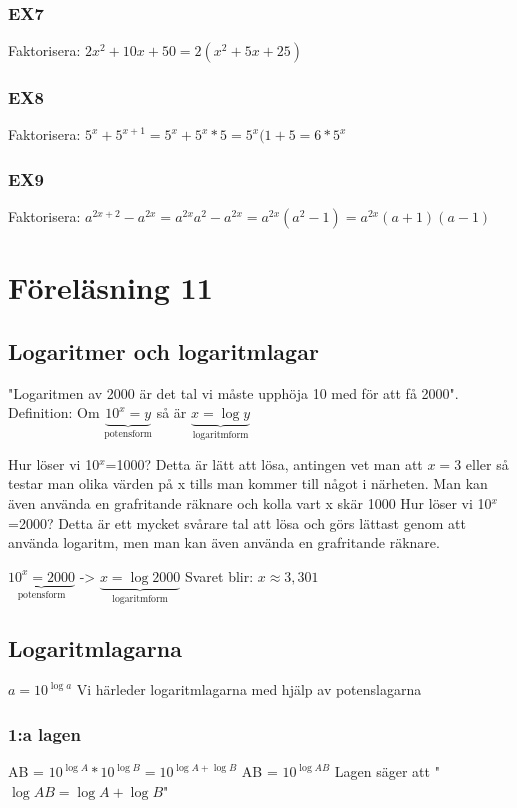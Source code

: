 \documentclass[a4paper,11pt]{article}
\begin{document}
\begin{flushleft}
\subsubsection{EX7}
Faktorisera: $ 2x^2+10x+50 = 2(x^2+5x+25) $
\subsubsection{EX8}
Faktorisera: $ 5^x+5^{x+1} = 5^x+5^x*5 = 5^x(1+5 = 6*5^x $
\subsubsection{EX9}
Faktorisera: $ a^{2x+2}-a^{2x} = a^{2x}a^2-a^{2x} = a^{2x}(a^2-1) = a^{2x}(a+1)(a-1) $
\newpage
\section{Föreläsning 11}
\subsection{Logaritmer och logaritmlagar}
"Logaritmen av 2000 är det tal vi måste upphöja 10 med för att få 2000".\newline\newline
Definition: Om $ \underbrace{10^x = y}_{\text{potensform}} $ så är $ \underbrace{x=\log{y}}_{\text{logaritmform}} $\newline

Hur löser vi 10$^x$=1000? Detta är lätt att lösa, antingen vet man att $x=3$ eller så testar man olika värden på x tills man kommer till något i närheten.
Man kan även använda en grafritande räknare och kolla vart x skär 1000\newline
Hur löser vi 10$^x$=2000? Detta är ett mycket svårare tal att lösa och görs lättast genom att använda logaritm, men man kan även använda en grafritande räknare.\newline

$ \underbrace{10^x = 2000}_{\text{potensform}} $ -> $ \underbrace{x=\log{2000}}_{\text{logaritmform}} $\newline
Svaret blir: $ x \approx 3,301 $

\subsection{Logaritmlagarna}
$ a = 10^{\log{a}}$ \newline
Vi härleder logaritmlagarna med hjälp av potenslagarna
\subsubsection{1:a lagen}
AB = $10^{\log{A}}*10^{\log{B}} = 10^{\log{A}+\log{B}}$\newline
AB = $ 10^{\log{AB}} $ \newline
Lagen säger att "$\log{AB} = \log{A}+\log{B} $"

\end{flushleft}
\end{document}
